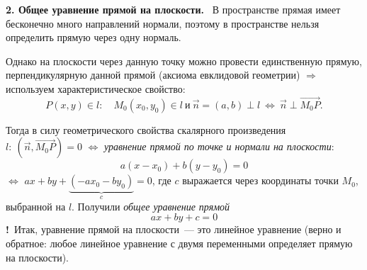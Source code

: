 \documentclass[a4paper,11pt]{article}
\newcommand{\lead}[1]{\textbf{\color{leadcol}#1}\ }
\newcommand{\imp}{\textbf{\color{red!70!black}!}\ }
\begin{document}
\lead{2. Общее уравнение прямой на плоскости.}
В пространстве прямая имеет бесконечно много направлений нормали, поэтому в пространстве нельзя
определить прямую через одну нормаль.
\begin{center}
\end{center}
Однако на плоскости через данную точку можно провести единственную прямую, перпендикулярную данной
прямой (аксиома евклидовой геометрии) $\Rightarrow$ используем характеристическое свойство:
\[
P(x,y)\in l:\quad M_0(x_0,y_0)\in l\ \text{и}\ \vec n=(a,b)\perp l\ \iff\ \vec n\perp\overrightarrow{M_0P}.
\]
\begin{center}
\end{center}
Тогда в силу геометрического свойства скалярного произведения
$l:\ (\vec n,\overrightarrow{M_0P})=0$ $\iff$ \emph{уравнение прямой по точке и нормали на плоскости}:
\[
\boxed{\ a(x-x_0)+b(y-y_0)=0\ }\tag{6}
\]
$\iff$ $ax+by+\underbrace{(-ax_0-by_0)}_{c}=0$, где $c$ выражается через координаты точки $M_0$,
выбранной на $l$. Получили \emph{общее уравнение прямой}
\[
\boxed{\ ax+by+c=0\ }\tag{7}
\]
\imp Итак, уравнение прямой на плоскости~--- это линейное уравнение (верно и обратное: любое линейное
уравнение с двумя переменными определяет прямую на плоскости).
\end{document}

